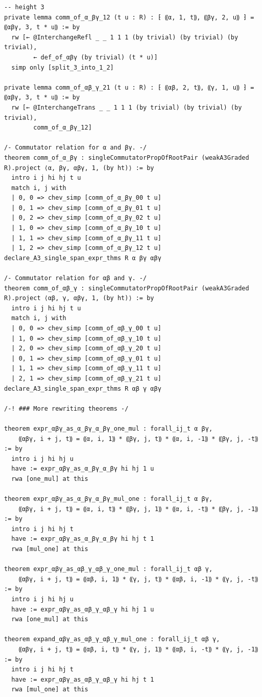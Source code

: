 \begin{Verbatim}
-- height 3
private lemma comm_of_α_βγ_12 (t u : R) : ⁅ ⸨α, 1, t⸩, ⸨βγ, 2, u⸩ ⁆ = ⸨αβγ, 3, t * u⸩ := by
  rw [← @InterchangeRefl _ _ 1 1 1 (by trivial) (by trivial) (by trivial),
        ← def_of_αβγ (by trivial) (t * u)]
  simp only [split_3_into_1_2]

private lemma comm_of_αβ_γ_21 (t u : R) : ⁅ ⸨αβ, 2, t⸩, ⸨γ, 1, u⸩ ⁆ = ⸨αβγ, 3, t * u⸩ := by
  rw [← @InterchangeTrans _ _ 1 1 1 (by trivial) (by trivial) (by trivial),
        comm_of_α_βγ_12]

/- Commutator relation for α and βγ. -/
theorem comm_of_α_βγ : singleCommutatorPropOfRootPair (weakA3Graded R).project ⟨α, βγ, αβγ, 1, (by ht)⟩ := by
  intro i j hi hj t u
  match i, j with
  | 0, 0 => chev_simp [comm_of_α_βγ_00 t u]
  | 0, 1 => chev_simp [comm_of_α_βγ_01 t u]
  | 0, 2 => chev_simp [comm_of_α_βγ_02 t u]
  | 1, 0 => chev_simp [comm_of_α_βγ_10 t u]
  | 1, 1 => chev_simp [comm_of_α_βγ_11 t u]
  | 1, 2 => chev_simp [comm_of_α_βγ_12 t u]
declare_A3_single_span_expr_thms R α βγ αβγ

/- Commutator relation for αβ and γ. -/
theorem comm_of_αβ_γ : singleCommutatorPropOfRootPair (weakA3Graded R).project ⟨αβ, γ, αβγ, 1, (by ht)⟩ := by
  intro i j hi hj t u
  match i, j with
  | 0, 0 => chev_simp [comm_of_αβ_γ_00 t u]
  | 1, 0 => chev_simp [comm_of_αβ_γ_10 t u]
  | 2, 0 => chev_simp [comm_of_αβ_γ_20 t u]
  | 0, 1 => chev_simp [comm_of_αβ_γ_01 t u]
  | 1, 1 => chev_simp [comm_of_αβ_γ_11 t u]
  | 2, 1 => chev_simp [comm_of_αβ_γ_21 t u]
declare_A3_single_span_expr_thms R αβ γ αβγ

/-! ### More rewriting theorems -/

theorem expr_αβγ_as_α_βγ_α_βγ_one_mul : forall_ij_t α βγ,
    ⸨αβγ, i + j, t⸩ = ⸨α, i, 1⸩ * ⸨βγ, j, t⸩ * ⸨α, i, -1⸩ * ⸨βγ, j, -t⸩ := by
  intro i j hi hj u
  have := expr_αβγ_as_α_βγ_α_βγ hi hj 1 u
  rwa [one_mul] at this

theorem expr_αβγ_as_α_βγ_α_βγ_mul_one : forall_ij_t α βγ,
    ⸨αβγ, i + j, t⸩ = ⸨α, i, t⸩ * ⸨βγ, j, 1⸩ * ⸨α, i, -t⸩ * ⸨βγ, j, -1⸩ := by
  intro i j hi hj t
  have := expr_αβγ_as_α_βγ_α_βγ hi hj t 1
  rwa [mul_one] at this

theorem expr_αβγ_as_αβ_γ_αβ_γ_one_mul : forall_ij_t αβ γ,
    ⸨αβγ, i + j, t⸩ = ⸨αβ, i, 1⸩ * ⸨γ, j, t⸩ * ⸨αβ, i, -1⸩ * ⸨γ, j, -t⸩ := by
  intro i j hi hj u
  have := expr_αβγ_as_αβ_γ_αβ_γ hi hj 1 u
  rwa [one_mul] at this

theorem expand_αβγ_as_αβ_γ_αβ_γ_mul_one : forall_ij_t αβ γ,
    ⸨αβγ, i + j, t⸩ = ⸨αβ, i, t⸩ * ⸨γ, j, 1⸩ * ⸨αβ, i, -t⸩ * ⸨γ, j, -1⸩ := by
  intro i j hi hj t
  have := expr_αβγ_as_αβ_γ_αβ_γ hi hj t 1
  rwa [mul_one] at this


\end{Verbatim}
